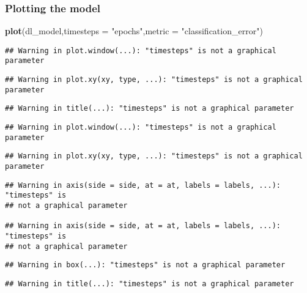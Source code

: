 \documentclass[]{article}
\newenvironment{Shaded}{\begin{snugshade}}{\end{snugshade}}
\newcommand{\KeywordTok}[1]{\textcolor[rgb]{0.13,0.29,0.53}{\textbf{#1}}}
\newcommand{\DataTypeTok}[1]{\textcolor[rgb]{0.13,0.29,0.53}{#1}}
\newcommand{\StringTok}[1]{\textcolor[rgb]{0.31,0.60,0.02}{#1}}
\newcommand{\NormalTok}[1]{#1}
\begin{document}
\subsubsection{Plotting the model}\label{plotting-the-model}

\begin{Shaded}
\begin{Highlighting}[]
\KeywordTok{plot}\NormalTok{(dl_model,}\DataTypeTok{timesteps =} \StringTok{"epochs"}\NormalTok{,}\DataTypeTok{metric =} \StringTok{"classification_error"}\NormalTok{)}
\end{Highlighting}
\end{Shaded}

\begin{verbatim}
## Warning in plot.window(...): "timesteps" is not a graphical parameter
\end{verbatim}

\begin{verbatim}
## Warning in plot.xy(xy, type, ...): "timesteps" is not a graphical parameter
\end{verbatim}

\begin{verbatim}
## Warning in title(...): "timesteps" is not a graphical parameter
\end{verbatim}

\begin{verbatim}
## Warning in plot.window(...): "timesteps" is not a graphical parameter
\end{verbatim}

\begin{verbatim}
## Warning in plot.xy(xy, type, ...): "timesteps" is not a graphical parameter
\end{verbatim}

\begin{verbatim}
## Warning in axis(side = side, at = at, labels = labels, ...): "timesteps" is
## not a graphical parameter

## Warning in axis(side = side, at = at, labels = labels, ...): "timesteps" is
## not a graphical parameter
\end{verbatim}

\begin{verbatim}
## Warning in box(...): "timesteps" is not a graphical parameter
\end{verbatim}

\begin{verbatim}
## Warning in title(...): "timesteps" is not a graphical parameter
\end{verbatim}
\end{document}
